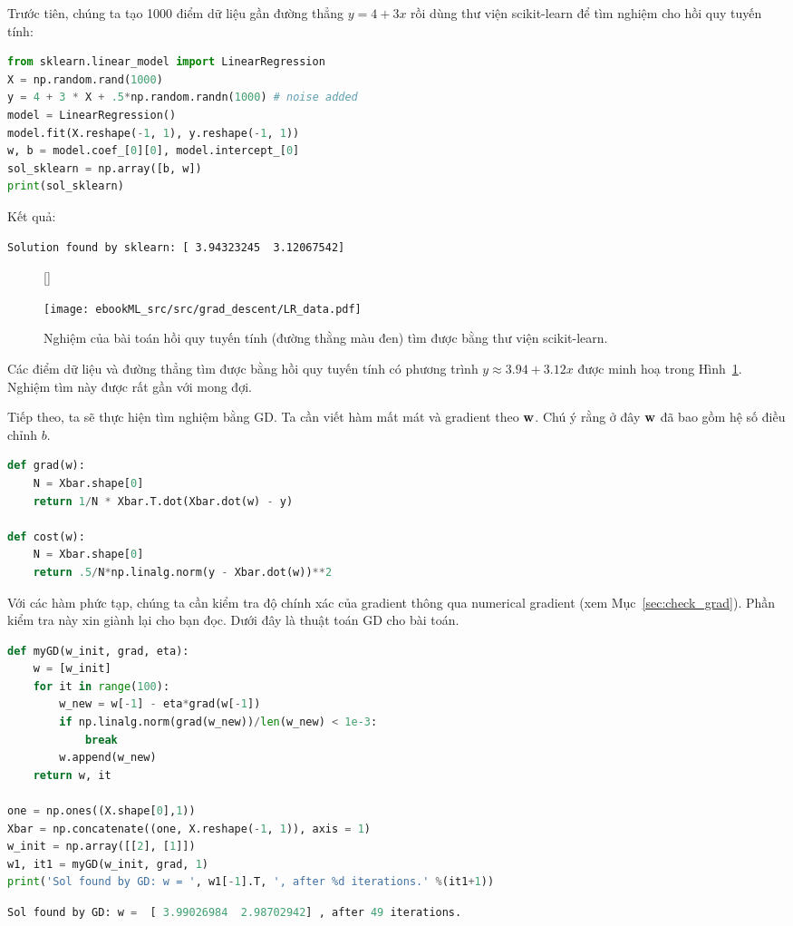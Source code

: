 Trước tiên, chúng ta tạo 1000 điểm dữ liệu gần đường thẳng $y = 4 + 3x$ rồi dùng thư viện scikit-learn để tìm nghiệm cho hồi quy tuyến tính:

\begin{lstlisting}[language=Python]
from sklearn.linear_model import LinearRegression
X = np.random.rand(1000)
y = 4 + 3 * X + .5*np.random.randn(1000) # noise added
model = LinearRegression()
model.fit(X.reshape(-1, 1), y.reshape(-1, 1))
w, b = model.coef_[0][0], model.intercept_[0]
sol_sklearn = np.array([b, w])
print(sol_sklearn)
\end{lstlisting}
Kết quả:
\begin{lstlisting}
Solution found by sklearn: [ 3.94323245  3.12067542]
\end{lstlisting}


\begin{figure}[t]
[\FBwidth]
{\caption{
Nghiệm của bài toán hồi quy tuyến tính (đường thằng màu đen) tìm được bằng
thư viện scikit-learn.
}
\label{fig:7_lr_sklearn}}
{ %

\texttt{[image: ebookML\_src/src/grad\_descent/LR\_data.pdf]}
}
\end{figure}
Các điểm dữ liệu và đường thẳng tìm được bằng hồi quy tuyến tính có phương trình
$y \approx 3.94 + 3.12x$ được minh hoạ trong Hình~\ref{fig:7_lr_sklearn}. Nghiệm
tìm này được rất gần với mong đợi.

Tiếp theo, ta sẽ thực hiện tìm nghiệm bằng GD. Ta cần viết hàm mất mát và gradient theo $\mathbf{w}$. Chú ý rằng ở đây $\mathbf{w}$ đã bao gồm hệ số điều chỉnh $b$.

\begin{lstlisting}[language=Python]
def grad(w):
    N = Xbar.shape[0]
    return 1/N * Xbar.T.dot(Xbar.dot(w) - y)

def cost(w):
    N = Xbar.shape[0]
    return .5/N*np.linalg.norm(y - Xbar.dot(w))**2
\end{lstlisting}

Với các hàm phức tạp, chúng ta cần kiểm tra độ chính xác của gradient thông
qua numerical gradient (xem Mục~\ref{sec:check_grad}). Phần kiểm tra này xin giành lại cho bạn đọc. Dưới đây là thuật toán GD cho bài toán.

\begin{lstlisting}[language=Python]
def myGD(w_init, grad, eta):
    w = [w_init]
    for it in range(100):
        w_new = w[-1] - eta*grad(w[-1])
        if np.linalg.norm(grad(w_new))/len(w_new) < 1e-3:
            break
        w.append(w_new)
    return w, it

one = np.ones((X.shape[0],1))
Xbar = np.concatenate((one, X.reshape(-1, 1)), axis = 1)
w_init = np.array([[2], [1]])
w1, it1 = myGD(w_init, grad, 1)
print('Sol found by GD: w = ', w1[-1].T, ', after %d iterations.' %(it1+1))
\end{lstlisting}
\kq
\begin{lstlisting}[language=Python]
Sol found by GD: w =  [ 3.99026984  2.98702942] , after 49 iterations.
\end{lstlisting}

